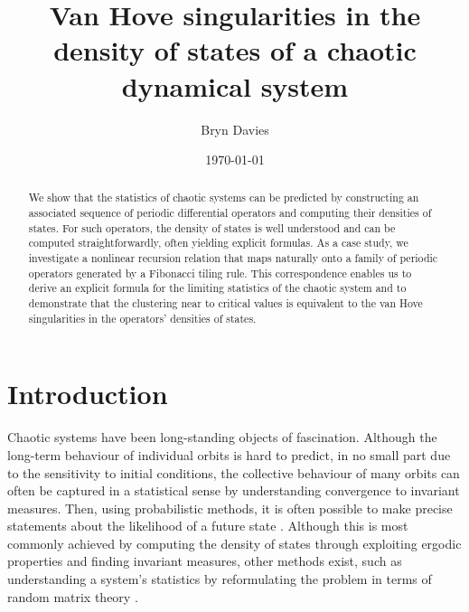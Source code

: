 \documentclass[nofootinbib,prb,amsmath,amssymb,twocolumn,floatfix]{revtex4-2}
\theoremstyle{definition}
\begin{document}

\title{Van Hove singularities in the density of states of a chaotic dynamical system}


\author{Bryn Davies}


\date{\today}

\begin{abstract}
	We show that the statistics of chaotic systems can be predicted by constructing an associated sequence of periodic differential operators and computing their densities of states. For such operators, the density of states is well understood and can be computed straightforwardly, often yielding explicit formulas. As a case study, we investigate a nonlinear recursion relation that maps naturally onto a family of periodic operators generated by a Fibonacci tiling rule. This correspondence enables us to derive an explicit formula for the limiting statistics of the chaotic system and to demonstrate that the clustering near to critical values is equivalent to the van Hove singularities in the operators' densities of states.
\end{abstract}

\maketitle

\section{Introduction}

Chaotic systems have been long-standing objects of fascination. Although the  long-term behaviour of individual orbits is hard to predict, in no small part due to the sensitivity to initial conditions, the collective behaviour of many orbits can often be captured in a statistical sense by understanding convergence to invariant measures.  Then, using probabilistic methods, it is often possible to make precise statements about the likelihood of a future state \cite{lasota2013chaos, walters2000introduction}. Although this is most commonly achieved by computing the density of states through exploiting ergodic properties and finding invariant measures, other methods exist, such as understanding a system's statistics by reformulating the problem in terms of random matrix theory \cite{erdHos2017dynamical, haake1991quantum}. 

\end{document}
